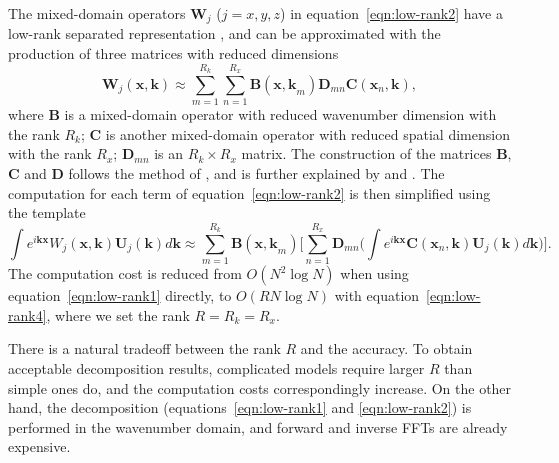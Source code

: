 \documentclass[manuscript,ulem,graphix,revised]{geophysics}
\begin{document}
The mixed-domain operators $\mathbf{W}_j$ ($j=x,y,z$) in equation~\ref{eqn:low-rank2} have a low-rank separated representation \citep{fomel13}, and can be approximated with the production of three matrices with reduced dimensions 
\begin{equation}
\mathbf{W}_j(\mathbf{x,k})\approx \sum^{R_k}_{m=1}\sum^{R_x}_{n=1}\mathbf{B}(\mathbf{x,k}_{m})\mathbf{D}_{m n}\mathbf{C}(\mathbf{x}_{n},\mathbf{k}), 
\label{eqn:low-rank3}
\end{equation}
where $\mathbf{B}$ is a mixed-domain operator with reduced wavenumber dimension with the rank $R_k$; $\mathbf{C}$ is another mixed-domain operator with reduced spatial dimension with the rank $R_x$; $\mathbf{D}_{m n}$ is an $R_k \times R_x$ matrix. The construction of the matrices $\mathbf{B}$, $\mathbf{C}$ and $\mathbf{D}$ follows the method of \citet{engquist09}, and is further explained by \citet{fomel13} and \citet{cheng14}. The computation for each term of equation~\ref{eqn:low-rank2} is then simplified using the template
\begin{equation}
\int e^{i\mathbf{kx}}W_j(\mathbf{x,k})\mathbf{U}_j(\mathbf{k})d\mathbf{k}\approx\sum^{R_k}_{m=1}\mathbf{B}(\mathbf{x,k}_{m}) \bigg[\sum^{R_x}_{n=1} \mathbf{D}_{m n} \Big(\int e^{i\mathbf{kx}} \mathbf{C}(\mathbf{x}_{n},\mathbf{k}) \mathbf{U}_j(\mathbf{k})d \mathbf{k}\Big)\bigg]. 
\label{eqn:low-rank4}
\end{equation}
The computation cost is reduced from $O(N^2\log{N})$ when using equation~\ref{eqn:low-rank1} directly, to $O(RN\log{N})$ with equation~\ref{eqn:low-rank4}, where we set the rank $R=R_k=R_x$.

There is a natural tradeoff between the rank $R$ and the accuracy. To obtain acceptable decomposition results, complicated models require larger $R$ than simple ones do, and the computation costs correspondingly increase. On the other hand, the decomposition (equations~\ref{eqn:low-rank1} and \ref{eqn:low-rank2}) is performed in the wavenumber domain, and forward and inverse FFTs are already expensive. 

\end{document}
